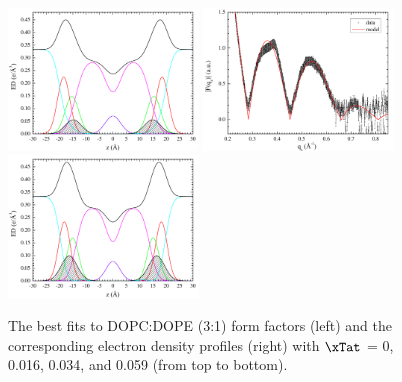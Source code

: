 \begin{figure}[htbp]
  \includegraphics[width=0.45\textwidth,valign=t]{./figures/Tat/SDP_Results/EDP/DOPCDOPE3to1_Tat_28to1_3p0_EDP1}
  \includegraphics[width=0.45\textwidth,valign=t]{figures/Tat/SDP_Results/XFF/DOPCDOPE3to1_Tat_16to1_3p0_XFF1}
  \includegraphics[width=0.45\textwidth,valign=t]{./figures/Tat/SDP_Results/EDP/DOPCDOPE3to1_Tat_16to1_3p0_EDP1}
  \caption{The best fits to DOPC:DOPE (3:1) form factors (left) and the corresponding 
  electron density profiles (right) with $\xTat$ = 0, 0.016, 0.034, 
  and 0.059 (from top to bottom).}
  \label{fig:DOPCDOPE3to1_Tat_XFF1}
\end{figure}

